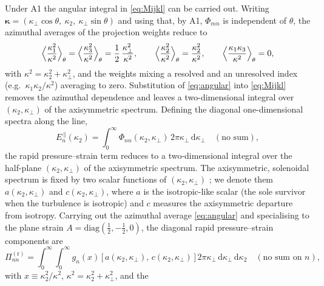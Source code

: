\documentclass[lineno]{JFM-FLM_Au}
\begin{document}
Under A1 the angular integral in \eqref{eq:Mijkl} can be carried out. Writing
$\boldsymbol{\kappa}=(\kappa_\perp\cos\theta,\ \kappa_2,\
\kappa_\perp\sin\theta)$ and using that, by A1, $\Phi_{mn}$ is independent of
$\theta$, the azimuthal averages of the projection weights reduce to
\begin{equation}
  \Bigl\langle \frac{\kappa_1^2}{\kappa^2}\Bigr\rangle_\theta
  = \Bigl\langle \frac{\kappa_3^2}{\kappa^2}\Bigr\rangle_\theta
  = \frac{1}{2}\,\frac{\kappa_\perp^2}{\kappa^2},
  \qquad
  \Bigl\langle \frac{\kappa_2^2}{\kappa^2}\Bigr\rangle_\theta
  = \frac{\kappa_2^2}{\kappa^2},
  \qquad
  \Bigl\langle \frac{\kappa_1\kappa_3}{\kappa^2}\Bigr\rangle_\theta = 0,
  \label{eq:angular}
\end{equation}
with $\kappa^2=\kappa_2^2+\kappa_\perp^2$, and the weights mixing a resolved
and an unresolved index (e.g.\ $\kappa_1\kappa_2/\kappa^2$) averaging to zero.
Substitution of \eqref{eq:angular} into \eqref{eq:Mijkl} removes the azimuthal
dependence and leaves a two-dimensional integral over $(\kappa_2,\kappa_\perp)$
of the axisymmetric spectrum. Defining the diagonal one-dimensional spectra
along the line,
\begin{equation}
  E_n^{\,\|}(\kappa_2)
   = \int_0^\infty \Phi_{nn}(\kappa_2,\kappa_\perp)\,
     2\pi\kappa_\perp\,\mathrm{d}\kappa_\perp
   \quad(\text{no sum}),
   \label{eq:Epar}
\end{equation}
the rapid pressure--strain term reduces to a two-dimensional integral over the
half-plane $(\kappa_2,\kappa_\perp)$ of the axisymmetric spectrum. The
axisymmetric, solenoidal spectrum is fixed by two scalar functions of
$(\kappa_2,\kappa_\perp)$ \citep{Batchelor1946,ChandrasekharAxisym1950}; we
denote them $a(\kappa_2,\kappa_\perp)$ and $c(\kappa_2,\kappa_\perp)$, where
$a$ is the isotropic-like scalar (the sole survivor when the turbulence is
isotropic) and $c$ measures the axisymmetric departure from isotropy. Carrying
out the azimuthal average \eqref{eq:angular} and specialising to the plane
strain $A=\mathrm{diag}(\tfrac12,-\tfrac12,0)$, the diagonal rapid
pressure--strain components are
\begin{equation}
  \Pi^{(\mathrm r)}_{nn}
  = \int_{0}^{\infty}\!\!\int_{0}^{\infty}
      g_{n}(x)\,\bigl[\,a(\kappa_2,\kappa_\perp),\,c(\kappa_2,\kappa_\perp)\,\bigr]\,
      2\pi\kappa_\perp\,\mathrm{d}\kappa_\perp\,\mathrm{d}\kappa_2
   \quad(\text{no sum on }n),
  \label{eq:Piclosed}
\end{equation}
with $x\equiv\kappa_2^2/\kappa^2$, $\kappa^2=\kappa_2^2+\kappa_\perp^2$, and the
\end{document}
